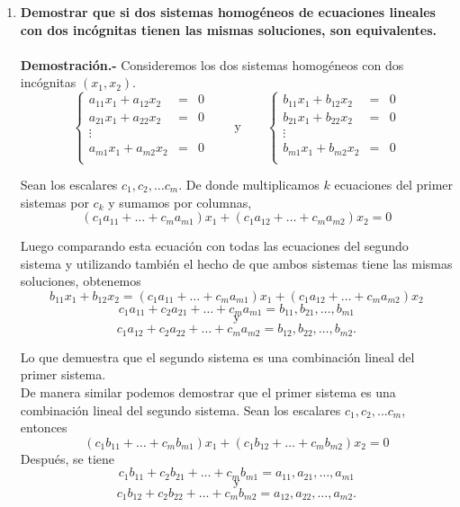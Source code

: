 \begin{enumerate}[\bfseries 1.]
    \item \textbf{Demostrar que si dos sistemas homogéneos de ecuaciones lineales con dos incógnitas tienen las mismas soluciones, son equivalentes.\\\\
	Demostración.-}\; Consideremos los dos sistemas homogéneos con dos incógnitas $(x_1,x_2)$.
	$$\left\{\begin{array}{ccc}
		a_{11} x_1 + a_{12} x_2 &=& 0\\
		a_{21} x_1 + a_{22} x_2 &=& 0\\
		\vdots\\
		a_{m1} x_1 + a_{m2} x_2 &=& 0\\
	\end{array}\right. \qquad \mbox{y} \qquad 
	\left\{\begin{array}{ccc}
		b_{11} x_1 + b_{12} x_2 &=& 0\\
		b_{21} x_1 + b_{22} x_2 &=& 0\\
		\vdots\\
		b_{m1} x_1 + b_{m2} x_2 &=& 0\\
	\end{array}\right.$$

	Sean los escalares $c_1,c_2,\ldots c_m$. De donde multiplicamos $k$ ecuaciones del primer sistemas por $c_k$ y sumamos por columnas,
	$$\left(c_1a_{11}+\ldots + c_m a_{m1}\right)x_1 + \left(c_1 a_{12}+\ldots + c_m a_{m2}\right)x_2=0$$

	Luego comparando esta ecuación con todas las ecuaciones del segundo sistema y utilizando también el hecho de que ambos sistemas tiene las mismas soluciones, obtenemos
	$$b_{11}x_1+b_{12}x_2=\left(c_1a_{11}+\ldots + c_m a_{m1}\right)x_1 + \left(c_1 a_{12}+\ldots + c_m a_{m2}\right)x_2$$
	$$c_1a_{11}+c_2a_{21}+\ldots + c_m a_{m1}=b_{11}, b_{21}, \ldots, b_{m1}$$
	$$\mbox{y}$$
	$$c_1a_{12}+c_2a_{22}+\ldots + c_m a_{m2}=b_{12}, b_{22}, \ldots, b_{m2}.$$

	Lo que demuestra que el segundo sistema es una combinación lineal del primer sistema.\\

	De manera similar podemos demostrar que el primer sistema es una combinación lineal del segundo sistema. Sean los escalares $c_1,c_2,\ldots c_m$, entonces
	$$\left(c_1b_{11}+\ldots + c_m b_{m1}\right)x_1 + \left(c_1 b_{12}+\ldots + c_m b_{m2}\right)x_2=0$$
	Después, se tiene
	$$c_1b_{11}+c_2b_{21}+\ldots + c_m b_{m1}=a_{11}, a_{21}, \ldots, a_{m1}$$
	$$\mbox{y}$$
	$$c_1b_{12}+c_2b_{22}+\ldots + c_m b_{m2}=a_{12}, a_{22}, \ldots, a_{m2}.$$


\end{enumerate}
